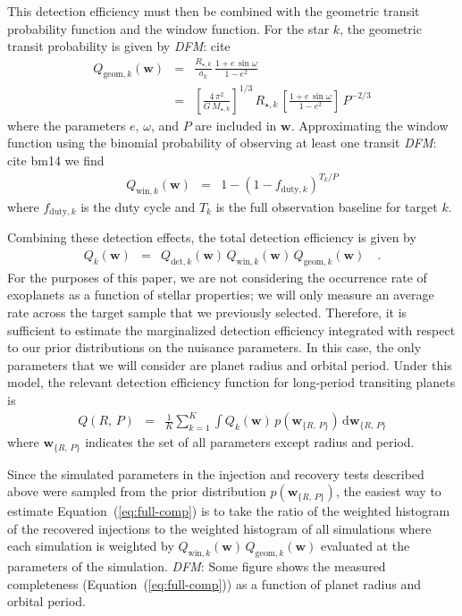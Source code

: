 \documentclass[manuscript, letterpaper]{aastex6}
\renewcommand{\eqref}[1]{\ref{eq:#1}}
\newcommand{\Eq}[1]{Equation~(\eqref{#1})}
\newcommand{\eq}[1]{\Eq{#1}}
\newcommand{\eqlabel}[1]{\label{eq:#1}}
\newcommand{\dd}{\ensuremath{\,\mathrm{d}}}
\newcommand{\bvec}[1]{{\ensuremath{\boldsymbol{#1}}}}
\newcommand{\todo}[3]{{\color{#2}\emph{#1}: #3}}
\newcommand{\dfmtodo}[1]{\todo{DFM}{red}{#1}}
\newcommand{\paper}{paper}
\newcommand{\params}{{\ensuremath{\bvec{w}}}}
\begin{document}
This detection efficiency must then be combined with the geometric transit
probability function and the window function.
For the star $k$, the geometric transit probability is given by \dfmtodo{cite}
\begin{eqnarray}
Q_{\mathrm{geom},k} (\params) &=& \frac{R_{\star,k}}{a_k}
    \, \frac{1 + e\,\sin\omega}{1-e^2} \\
&=& \left[\frac{4\,\pi^2}{G\,M_{\star,k}}\right]^{1/3}\,R_{\star,k}
    \, \left[\frac{1 + e\,\sin \omega}{1-e^2}\right]
    \, P^{-2/3}
\end{eqnarray}
where the parameters $e$, $\omega$, and $P$ are included in \params.
Approximating the window function using the binomial probability of observing
at least one transit \dfmtodo{cite bm14} we find
\begin{eqnarray}
Q_{\mathrm{win},k} (\params) &=& 1 - (1 - f_{\mathrm{duty},k})^{T_k/P}
\end{eqnarray}
where $f_{\mathrm{duty},k}$ is the duty cycle and $T_k$ is the full
observation baseline for target $k$.

Combining these detection effects, the total detection efficiency is given by
\begin{eqnarray}
Q_k(\params) &=& Q_{\mathrm{det},k}(\params) \,
                 Q_{\mathrm{win},k} (\params) \,
                 Q_{\mathrm{geom},k} (\params) \quad.
\end{eqnarray}
For the purposes of this \paper, we are not considering the occurrence rate of
exoplanets as a function of stellar properties; we will only measure an
average rate across the target sample that we previously selected.
Therefore, it is sufficient to estimate the marginalized detection efficiency
integrated with respect to our prior distributions on the nuisance parameters.
In this case, the only parameters that we will consider are planet radius and
orbital period.
Under this model, the relevant detection efficiency function for long-period
transiting planets is
\begin{eqnarray}\eqlabel{full-comp}
Q(R,\,P) &=& \frac{1}{K} \sum_{k=1}^{K} \int Q_k(\params) \,
    p(\params_{\{R,\,P\}}) \dd\params_{\{R,\,P\}}
\end{eqnarray}
where $\params_{\{R,\,P\}}$ indicates the set of all parameters except radius
and period.

Since the simulated parameters in the injection and recovery tests described
above were sampled from the prior distribution $p(\params_{\{R,\,P\}})$, the
easiest way to estimate \eq{full-comp} is to take the ratio of the weighted
histogram of the recovered injections to the weighted histogram of all
simulations where each simulation is weighted by
$Q_{\mathrm{win},k} (\params) \, Q_{\mathrm{geom},k} (\params)$ evaluated at
the parameters of the simulation.
\dfmtodo{Some figure} shows the measured completeness (\eq{full-comp}) as a
function of planet radius and orbital period.
\end{document}
